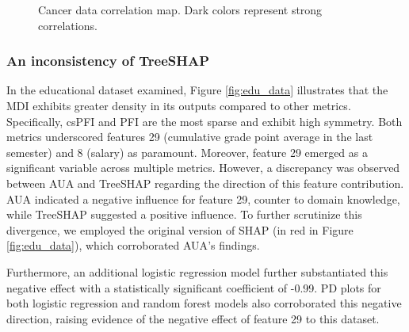 \begin{figure}[ht!]
\centering
  \caption{Cancer data correlation map. Dark colors represent strong correlations.}
    \label{fig:correlation}
\end{figure}


\subsubsection{An inconsistency of TreeSHAP}

In the educational dataset examined, Figure \ref{fig:edu_data} illustrates that the \gls{MDI} exhibits greater density in its outputs compared to other metrics. Specifically, \gls{csPFI} and \gls{PFI} are the most sparse and exhibit high symmetry. Both metrics underscored features 29 (cumulative grade point average in the last semester) and 8 (salary) as paramount. Moreover, feature 29 emerged as a significant variable across multiple metrics. However, a discrepancy was observed between \gls{AUA} and TreeSHAP regarding the direction of this feature contribution. \gls{AUA} indicated a negative influence for feature 29, counter to domain knowledge, while TreeSHAP suggested a positive influence. To further scrutinize this divergence, we employed the original version of \gls{SHAP} (in red in Figure \ref{fig:edu_data}), which corroborated \gls{AUA}'s findings.

Furthermore, an additional logistic regression model further substantiated this negative effect with a statistically significant coefficient of -0.99. PD plots for both logistic regression and random forest models also corroborated this negative direction, raising evidence of the negative effect of feature 29 to this dataset. 


